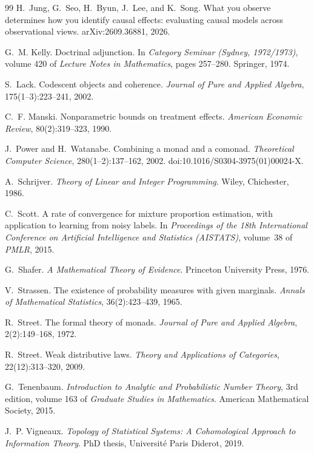 \documentclass[11pt]{article}
\theoremstyle{definition}
\theoremstyle{remark}
\begin{document}
\begin{thebibliography}{99}
H.~Jung, G.~Seo, H.~Byun, J.~Lee, and K.~Song.
\newblock What you observe determines how you identify causal effects: evaluating causal models
  across observational views.
\newblock arXiv:2609.36881, 2026.

G.~M. Kelly.
\newblock Doctrinal adjunction.
\newblock In \emph{Category Seminar (Sydney, 1972/1973)}, volume 420 of \emph{Lecture Notes in
  Mathematics}, pages 257--280. Springer, 1974.

S.~Lack.
\newblock Codescent objects and coherence.
\newblock \emph{Journal of Pure and Applied Algebra}, 175(1--3):223--241, 2002.

C.~F. Manski.
\newblock Nonparametric bounds on treatment effects.
\newblock \emph{American Economic Review}, 80(2):319--323, 1990.

J.~Power and H.~Watanabe.
\newblock Combining a monad and a comonad.
\newblock \emph{Theoretical Computer Science}, 280(1--2):137--162, 2002.
\newblock doi:10.1016/S0304-3975(01)00024-X.

A.~Schrijver.
\newblock \emph{Theory of Linear and Integer Programming}.
\newblock Wiley, Chichester, 1986.

C.~Scott.
\newblock A rate of convergence for mixture proportion estimation, with application to learning from
  noisy labels.
\newblock In \emph{Proceedings of the 18th International Conference on Artificial Intelligence and
  Statistics (AISTATS)}, volume~38 of \emph{PMLR}, 2015.

G.~Shafer.
\newblock \emph{A Mathematical Theory of Evidence}.
\newblock Princeton University Press, 1976.

V.~Strassen.
\newblock The existence of probability measures with given marginals.
\newblock \emph{Annals of Mathematical Statistics}, 36(2):423--439, 1965.

R.~Street.
\newblock The formal theory of monads.
\newblock \emph{Journal of Pure and Applied Algebra}, 2(2):149--168, 1972.

R.~Street.
\newblock Weak distributive laws.
\newblock \emph{Theory and Applications of Categories}, 22(12):313--320, 2009.

G.~Tenenbaum.
\newblock \emph{Introduction to Analytic and Probabilistic Number Theory}, 3rd edition, volume 163
  of \emph{Graduate Studies in Mathematics}.
\newblock American Mathematical Society, 2015.

J.~P. Vigneaux.
\newblock \emph{Topology of Statistical Systems: A Cohomological Approach to Information Theory}.
\newblock PhD thesis, Universit\'e Paris Diderot, 2019.

\end{thebibliography}
\end{document}
